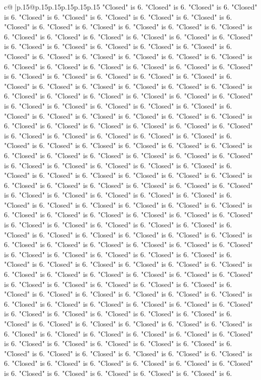 \documentclass{article}
\begin{document}
{\begin{supertabular}{c@{$\;$}|p{.15\linewidth}@{}p{.15\linewidth}p{.15\linewidth}p{.15\linewidth}p{.15\linewidth}p{.15\linewidth}}
{{{"Closed" is 6. "Closed" is 6. "Closed" is 6. "Closed" is 6. "Closed" is 6. "Closed" is 6. "Closed" is 6. "Closed" is 6. "Closed" is 6. "Closed" is 6. "Closed" is 6. "Closed" is 6. "Closed" is 6. "Closed" is 6. "Closed" is 6. "Closed" is 6. "Closed" is 6. "Closed" is 6. "Closed" is 6. "Closed" is 6. "Closed" is 6. "Closed" is 6. "Closed" is 6. "Closed" is 6. "Closed" is 6. "Closed" is 6. "Closed" is 6. "Closed" is 6. "Closed" is 6. "Closed" is 6. "Closed" is 6. "Closed" is 6. "Closed" is 6. "Closed" is 6. "Closed" is 6. "Closed" is 6. "Closed" is 6. "Closed" is 6. "Closed" is 6. "Closed" is 6. "Closed" is 6. "Closed" is 6. "Closed" is 6. "Closed" is 6. "Closed" is 6. "Closed" is 6. "Closed" is 6. "Closed" is 6. "Closed" is 6. "Closed" is 6. "Closed" is 6. "Closed" is 6. "Closed" is 6. "Closed" is 6. "Closed" is 6. "Closed" is 6. "Closed" is 6. "Closed" is 6. "Closed" is 6. "Closed" is 6. "Closed" is 6. "Closed" is 6. "Closed" is 6. "Closed" is 6. "Closed" is 6. "Closed" is 6. "Closed" is 6. "Closed" is 6. "Closed" is 6. "Closed" is 6. "Closed" is 6. "Closed" is 6. "Closed" is 6. "Closed" is 6. "Closed" is 6. "Closed" is 6. "Closed" is 6. "Closed" is 6. "Closed" is 6. "Closed" is 6. "Closed" is 6. "Closed" is 6. "Closed" is 6. "Closed" is 6. "Closed" is 6. "Closed" is 6. "Closed" is 6. "Closed" is 6. "Closed" is 6. "Closed" is 6. "Closed" is 6. "Closed" is 6. "Closed" is 6. "Closed" is 6. "Closed" is 6. "Closed" is 6. "Closed" is 6. "Closed" is 6. "Closed" is 6. "Closed" is 6. "Closed" is 6. "Closed" is 6. "Closed" is 6. "Closed" is 6. "Closed" is 6. "Closed" is 6. "Closed" is 6. "Closed" is 6. "Closed" is 6. "Closed" is 6. "Closed" is 6. "Closed" is 6. "Closed" is 6. "Closed" is 6. "Closed" is 6. "Closed" is 6. "Closed" is 6. "Closed" is 6. "Closed" is 6. "Closed" is 6. "Closed" is 6. "Closed" is 6. "Closed" is 6. "Closed" is 6. "Closed" is 6. "Closed" is 6. "Closed" is 6. "Closed" is 6. "Closed" is 6. "Closed" is 6. "Closed" is 6. "Closed" is 6. "Closed" is 6. "Closed" is 6. "Closed" is 6. "Closed" is 6. "Closed" is 6. "Closed" is 6. "Closed" is 6. "Closed" is 6. "Closed" is 6. "Closed" is 6. "Closed" is 6. "Closed" is 6. "Closed" is 6. "Closed" is 6. "Closed" is 6. "Closed" is 6. "Closed" is 6. "Closed" is 6. "Closed" is 6. "Closed" is 6. "Closed" is 6. "Closed" is 6. "Closed" is 6. "Closed" is 6. "Closed" is 6. "Closed" is 6. "Closed" is 6. "Closed" is 6. "Closed" is 6. "Closed" is 6. "Closed" is 6. "Closed" is 6. "Closed" is 6. "Closed" is 6. "Closed" is 6. "Closed" is 6. "Closed" is 6. "Closed" is 6. "Closed" is 6. "Closed" is 6. "Closed" is 6. "Closed" is 6. "Closed" is 6. "Closed" is 6. "Closed" is 6. "Closed" is 6. "Closed" is 6. "Closed" is 6. "Closed" is 6. "Closed" is 6. "Closed" is 6. "Closed" is 6. "Closed" is 6. "Closed" is 6. "Closed" is 6. "Closed" is 6. "Closed" is 6. "Closed" is 6. "Closed" is 6. "Closed" is 6. "Closed" is 6. "Closed" is 6. "Closed" is 6. "Closed" is 6. "Closed" is 6. "Closed" is 6. "Closed" is 6. "Closed" is 6. "Closed" is 6. "Closed" is 6. "Closed" is 6. "Closed" is 6. "Closed" is 6. "Closed" is 6. "Closed" is 6. "Closed" is 6. "Closed" is 6. "Closed" is 6. "Closed" is 6. "Closed" is 6. "Closed" is 6. }}}
\end{supertabular}}
\end{document}
